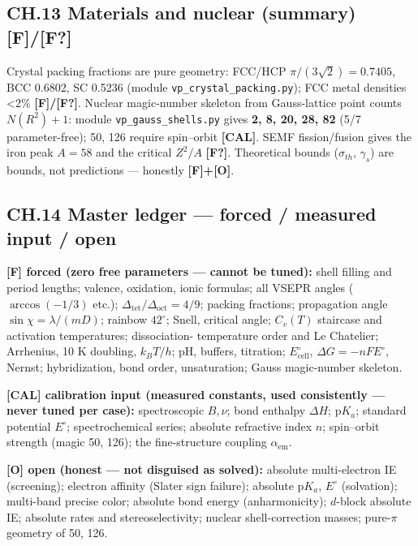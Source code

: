 \documentclass[
  10pt,
]{article}
\begin{document}
\hypertarget{ch.13-materials-and-nuclear-summary-ff}{%
\subsection{\texorpdfstring{CH.13 Materials and nuclear (summary)
\textbf{{[}F{]}/{[}F?{]}}}{CH.13 Materials and nuclear (summary) {[}F{]}/{[}F?{]}}}\label{ch.13-materials-and-nuclear-summary-ff}}

Crystal packing fractions are pure geometry: FCC/HCP
\(\pi/(3\sqrt2) = 0.7405\), BCC 0.6802, SC 0.5236 (module
\texttt{vp\_crystal\_packing.py}); FCC metal densities \textless2\%
\textbf{{[}F{]}/{[}F?{]}}. Nuclear magic-number skeleton from
Gauss-lattice point counts \(N(R^2)+1\): module
\texttt{vp\_gauss\_shells.py} gives \textbf{2, 8, 20, 28, 82} (5/7
parameter-free); 50, 126 require spin--orbit \textbf{{[}CAL{]}}. SEMF
fission/fusion gives the iron peak \(A=58\) and the critical \(Z^2/A\)
\textbf{{[}F?{]}}. Theoretical bounds (\(\sigma_{th}\), \(\gamma_s\))
are bounds, not predictions --- honestly \textbf{{[}F{]}+{[}O{]}}.

\hypertarget{ch.14-master-ledger-forced-measured-input-open}{%
\subsection{CH.14 Master ledger --- forced / measured input /
open}\label{ch.14-master-ledger-forced-measured-input-open}}

\textbf{{[}F{]} forced (zero free parameters --- cannot be tuned):}
shell filling and period lengths; valence, oxidation, ionic formulas;
all VSEPR angles (\(\arccos(-1/3)\) etc.);
\(\Delta_{\text{tet}}/ \Delta_{\text{oct}}=4/9\); packing fractions;
propagation angle \(\sin\chi=\lambda/(mD)\); rainbow \(42^\circ\);
Snell, critical angle; \(C_v(T)\) staircase and activation temperatures;
dissociation- temperature order and Le Chatelier; Arrhenius, 10 K
doubling, \(k_BT/h\); pH, buffers, titration; \(E^\circ_{\text{cell}}\),
\(\Delta G=-nFE^\circ\), Nernst; hybridization, bond order,
unsaturation; Gauss magic-number skeleton.

\textbf{{[}CAL{]} calibration input (measured constants, used
consistently --- never tuned per case):} spectroscopic \(B,\nu\); bond
enthalpy \(\Delta H\); \(\mathrm pK_a\); standard potential \(E^\circ\);
spectrochemical series; absolute refractive index \(n\); spin--orbit
strength (magic 50, 126); the fine-structure coupling
\(\alpha_{\mathrm{em}}\).

\textbf{{[}O{]} open (honest --- not disguised as solved):} absolute
multi-electron IE (screening); electron affinity (Slater sign failure);
absolute \(\mathrm pK_a\), \(E^\circ\) (solvation); multi-band precise
color; absolute bond energy (anharmonicity); \(d\)-block absolute IE;
absolute rates and stereoselectivity; nuclear shell-correction masses;
pure-\(\pi\) geometry of 50, 126.
\end{document}
